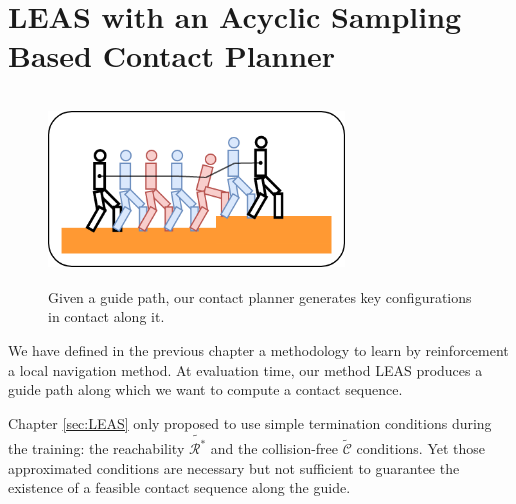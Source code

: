 


\chapter{LEAS with an Acyclic Sampling Based Contact Planner}
\label{sec:CP-SB}
\minitoc
\bigskip

\begin{figure}[h]
    \centering
    \includegraphics[width=0.7\textwidth, height=5cm]{Figures/Chapter_CPSB/strategies_cp_guide_A.png}
    \caption{Given a guide path, our contact planner generates key configurations in contact along it.}
    \label{fig:cp-sb:strategy_cp-sb}
\end{figure}


We have defined in the previous chapter a methodology to learn by reinforcement a local navigation method.
At evaluation time, our method LEAS produces a guide path along which we want to compute a contact sequence.

Chapter \ref{sec:LEAS} only proposed to use simple termination conditions during the training: the reachability $\tilde{\mathcal{R}^*}$ and the collision-free $\tilde{\mathcal{C}}$ conditions.
Yet those approximated conditions are necessary but not sufficient to guarantee the existence of a feasible contact sequence along the guide.


